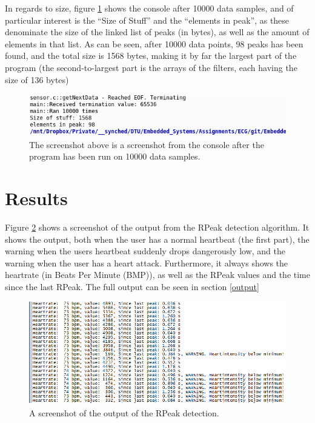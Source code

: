 \documentclass[12pt,a4paper]{article}
\begin{document}
	In regards to size, figure \ref{size_result} shows the console after 10000 data samples, and of particular interest is the ``Size of Stuff'' and the ``elements in peak'', as these denominate the size of the linked list of peaks (in bytes), as well as the amount of elements in that list. As can be seen, after 10000 data points, 98 peaks has been found, and the total size is 1568 bytes, making it by far the largest part of the program (the second-to-largest part is the arrays of the filters, each having the size of 136 bytes)
	
	\begin{figure}[h!]
			\centering
				\includegraphics[width=1\textwidth]{Screenshots/size_results.png}
			\caption{The screenshot above is a screenshot from the console after the program has been run on 10000 data samples.}
			\label{size_result}
		\end{figure}
	
\section{Results}
	Figure \ref{RPeakDetection_result} shows a screenshot of the output from the RPeak detection algorithm. It shows the output, both when the user has a normal heartbeat (the first part), the warning when the users heartbeat suddenly drops dangerously low, and the warning when the user has a heart attack. Furthermore, it always shows the heartrate (in Beats Per Minute (BMP)), as well as the RPeak values and the time since the last RPeak. The full output can be seen in section \ref{output}
	
	
	\begin{figure}[h!]
		\centering
			\includegraphics[width=1\textwidth]{Screenshots/RPeakDetection_result.png}
		\caption{A screenshot of the output of the RPeak detection.}
		\label{RPeakDetection_result}
	\end{figure}
\end{document}
